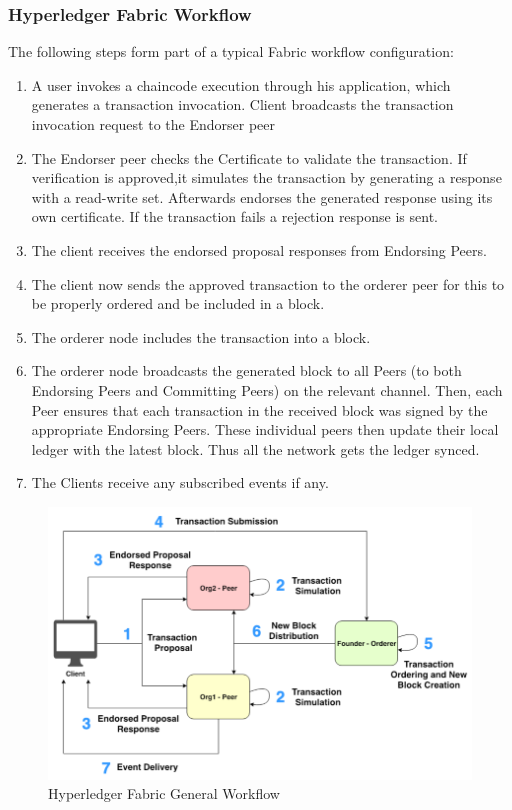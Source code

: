 \subsubsection{Hyperledger Fabric Workflow}
The following steps form part of a typical Fabric workflow configuration:
\begin{enumerate}
    \item A user invokes a chaincode execution through his application, which generates a transaction invocation. Client broadcasts the transaction invocation request to the Endorser peer
    \item The Endorser peer checks the Certificate to validate the transaction. If verification is approved,it simulates the transaction by generating a response with a read-write set. Afterwards endorses the generated response using its own certificate. If the transaction fails a rejection response is sent.
    \item The client receives the endorsed proposal responses from Endorsing Peers.
    \item The client now sends the approved transaction to the orderer peer for this to be properly ordered and be included in a block.
    \item The orderer node includes the transaction into a block.
    \item The orderer node broadcasts the generated block to all Peers (to both Endorsing Peers and Committing Peers) on the relevant channel. Then, each Peer ensures that each transaction in the received block was signed by the appropriate Endorsing Peers. These individual peers then update their local ledger with the latest block. Thus all the network gets the ledger synced.
    \item The Clients receive any subscribed events if any.
    
\end{enumerate}

\begin{figure}[!h]
    \centering
    \includegraphics[width=15cm]{img/HyperledgerWorkflow.png}
    \caption{Hyperledger Fabric General Workflow}
    \label{fig:HyperledgerWorkflow}
\end{figure}